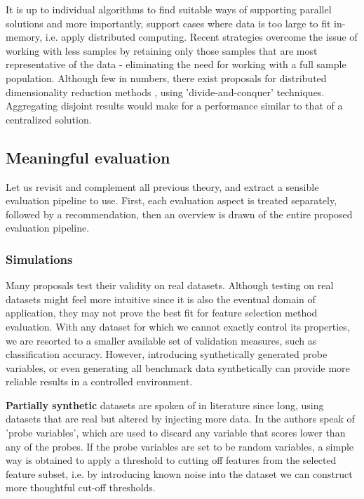 \documentclass{article}
\begin{document}
It is up to individual algorithms to find suitable ways of supporting parallel solutions and more importantly, support cases where data is too large to fit in-memory, i.e. apply distributed computing. Recent strategies overcome the issue of working with less samples by retaining only those samples that are most representative of the data - eliminating the need for working with a full sample population. Although few in numbers, there exist proposals for distributed dimensionality reduction methods \citep{JMLR:v21:19-537}, using 'divide-and-conquer' techniques. Aggregating disjoint results would make for a performance similar to that of a centralized solution.

\subsection{Meaningful evaluation}\label{sec:meaningful-evaluation}
Let us revisit and complement all previous theory, and extract a sensible evaluation pipeline to use. First, each evaluation aspect is treated separately, followed by a recommendation, then an overview is drawn of the entire proposed evaluation pipeline.


\subsubsection{Simulations}\label{sec:evaluation-simulations}
Many proposals test their validity on real datasets. Although testing on real datasets might feel more intuitive since it is also the eventual domain of application, they may not prove the best fit for feature selection method evaluation. With any dataset for which we cannot exactly control its properties, we are resorted to a smaller available set of validation measures, such as classification accuracy. However, introducing synthetically generated probe variables, or even generating all benchmark data synthetically can provide more reliable results in a controlled environment.

\textbf{Partially synthetic} datasets are spoken of in literature since long, using datasets that are real but altered by injecting more data. In \citep{guyon2003introduction} the authors speak of 'probe variables', which are used to discard any variable that scores lower than any of the probes. If the probe variables are set to be random variables, a simple way is obtained to apply a threshold to cutting off features from the selected feature subset, i.e. by introducing known noise into the dataset we can construct more thoughtful cut-off thresholds.
\end{document}

